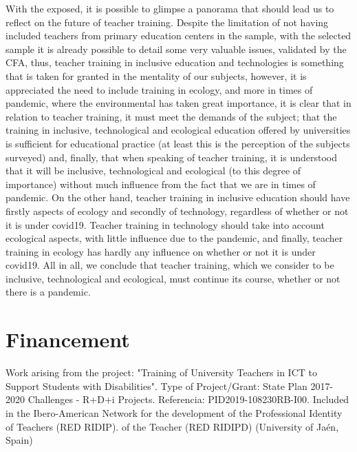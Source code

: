 \documentclass{textolivre}
\begin{document}
With the exposed, it is possible to glimpse a panorama that should lead us to reflect on the future of teacher training. Despite the limitation of not having included teachers from primary education centers in the sample, with the selected sample it is already possible to detail some very valuable issues, validated by the CFA, thus, teacher training in inclusive education and technologies is something that is taken for granted in the mentality of our subjects, however, it is appreciated the need to include training in ecology, and more in times of pandemic, where the environmental has taken great importance, it is clear that in relation to teacher training, it must meet the demands of the subject; that the training in inclusive, technological and ecological education offered by universities is sufficient for educational practice (at least this is the perception of the subjects surveyed) and, finally, that when speaking of teacher training, it is understood that it will be inclusive, technological and ecological (to this degree of importance) without much influence from the fact that we are in times of pandemic. On the other hand, teacher training in inclusive education should have firstly aspects of ecology and secondly of technology, regardless of whether or not it is under covid19. Teacher training in technology should take into account ecological aspects, with little influence due to the pandemic, and finally, teacher training in ecology has hardly any influence on whether or not it is under covid19. All in all, we conclude that teacher training, which we consider to be inclusive, technological and ecological, must continue its course, whether or not there is a pandemic.

\section{Financement}

Work arising from the project: "Training of University Teachers in ICT to Support Students with Disabilities". Type of Project/Grant: State Plan 2017-2020 Challenges - R+D+i Projects. Referencia: PID2019-108230RB-I00. Included in the Ibero-American Network for the development of the Professional Identity of Teachers (RED RIDIP). of the Teacher (RED RIDIPD) (University of Jaén, Spain)



\printbibliography\label{sec-bib}
\end{document}
